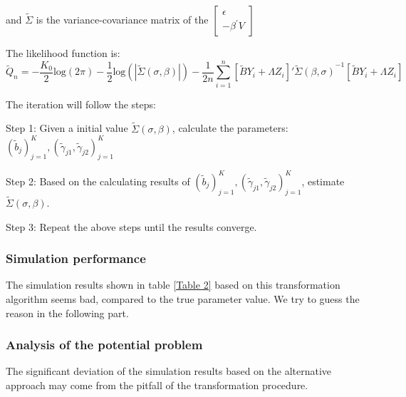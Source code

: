 \documentclass[12pt,pdftex,letterpaper]{article}
\begin{document}
and $\tilde{\Sigma}$ is the variance-covariance matrix of the  
$\begin{bmatrix}
\epsilon \\
-\beta^{'}V
\end{bmatrix}$

The likelihood function is:
$$\tilde{Q}_{n}=-\frac{K_{0}}{2}\mbox{log}(2\pi)-\frac{1}{2}\mbox{log}(|\tilde{\Sigma}(\sigma,\beta)|)-\frac{1}{2n}\sum_{i=1}^{n}[\tilde{B}Y_{i}+\Lambda Z_{i}]'{\tilde{\Sigma}(\beta,\sigma)}^{-1}[\tilde{B}Y_{i}+\Lambda Z_{i}]$$

The iteration will follow the steps:

Step 1: Given a initial value $\tilde{\Sigma}(\sigma,\beta)$, calculate the parameters: $(\tilde{b}_{j})_{j=1}^{K},(\tilde{\gamma}_{j1},\tilde{\gamma}_{j2})_{j=1}^{K}$

Step 2: Based on the calculating results of $(\tilde{b}_{j})_{j=1}^{K},(\tilde{\gamma}_{j1},\tilde{\gamma}_{j2})_{j=1}^{K}$, estimate $\tilde{\Sigma}(\sigma,\beta)$.

Step 3: Repeat the above steps until the results converge.

\subsubsection{Simulation performance}
\begin{table}[h]
\centering
\caption{One simulation result based on the alternative algorithm}
\label{Table 2}
\end{table}
The simulation results shown in table \ref{Table 2} based on this transformation algorithm seems bad, compared to the true parameter value. We try to guess the reason in the following part.

\subsubsection{Analysis of the potential problem}
    The significant deviation of the simulation results based on the alternative approach may come from the pitfall of the transformation procedure.
    
\end{document}
